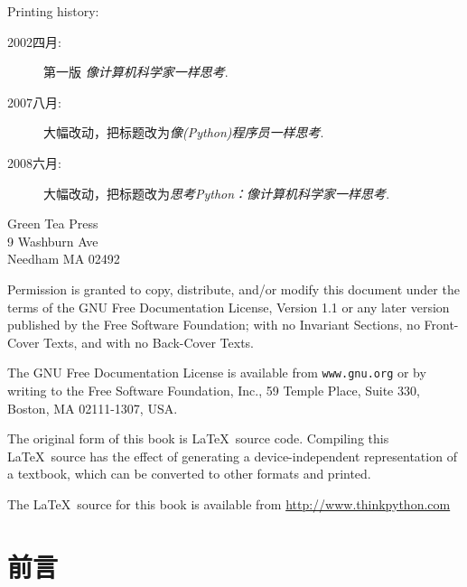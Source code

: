 \begin{latexonly}
{Printing history:

\begin{description}

\item[2002四月:] 第一版 {\em 像计算机科学家一样思考}.
\item[2007八月:] 大幅改动，把标题改为{\em 像(Python)程序员一样思考}.
\item[2008六月:] 大幅改动，把标题改为{\em 思考Python：像计算机科学家一样思考}.
\end{description}

\vspace{0.2in}

\begin{flushleft}  %
Green Tea Press \\
9 Washburn Ave\\
Needham MA 02492
\end{flushleft}


Permission is granted to copy, distribute, and/or modify this document
under the terms of the GNU Free Documentation License, Version 1.1 or
any later version published by the Free Software Foundation; with no
Invariant Sections, no Front-Cover Texts, and with no Back-Cover Texts.

The GNU Free Documentation License is available from {\tt www.gnu.org}
or by writing to the Free Software Foundation, Inc., 59 Temple Place,
Suite 330, Boston, MA 02111-1307, USA.

The original form of this book is \LaTeX\ source code.  Compiling this
\LaTeX\ source has the effect of generating a device-independent
representation of a textbook, which can be converted to other formats
and printed.

The \LaTeX\ source for this book is available from
\url{http://www.thinkpython.com}
\vspace{0.2in}
}

\end{latexonly}


\begin{htmlonly}


{\Large \thetitle}
\{\Large  Allen B.Downet}
\{\Large  翻译:Walter Lewis}

Version \theversion

\setcounter{chapter}{-1}
\end{htmlonly}

\chapter{前言}

